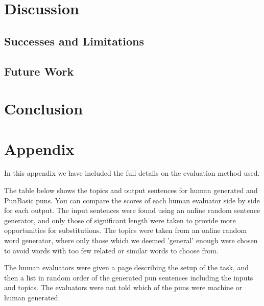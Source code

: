 \documentclass[11pt,letterpaper]{article}
\begin{document}
\section{Discussion}

\subsection{Successes and Limitations}

\subsection{Future Work}

\section{Conclusion}

\section{Appendix}

In this appendix we have included the full details on the evaluation method used.

The table below shows the topics and output sentences for human generated and PunBasic puns. You can compare the scores of each human evaluator side by side for each output. The input sentences were found using an online random sentence generator, and only those of significant length were taken to provide more opportunities for substitutions. The topics were taken from an online random word generator, where only those which we deemed 'general' enough were chosen to avoid words with too few related or similar words to choose from.

The human evaluators were given a page describing the setup of the task, and then a list in random order of the generated pun sentences including the inputs and topics. The evaluators were not told which of the puns were machine or human generated.
\end{document}
